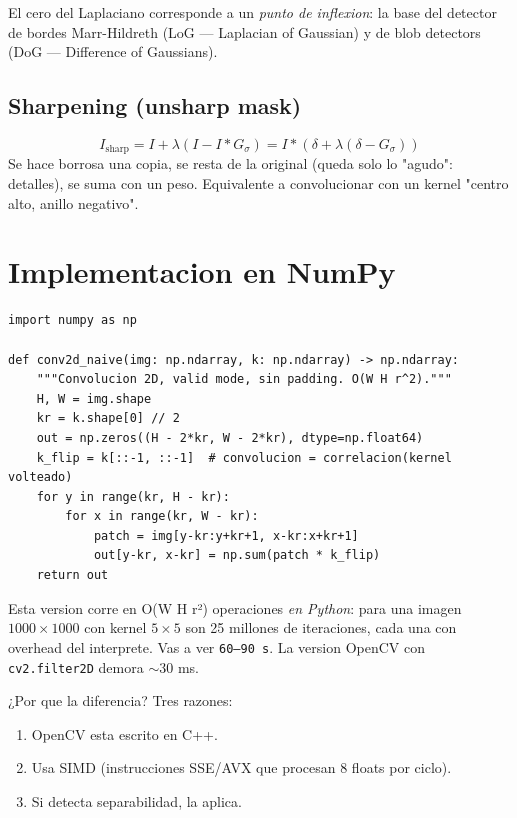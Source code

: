 \documentclass[11pt,a4paper,twoside,openright]{book}
\begin{document}
El cero del Laplaciano corresponde a un \emph{punto de inflexion}: la base del detector de bordes Marr-Hildreth (LoG --- Laplacian of Gaussian) y de blob detectors (DoG --- Difference of Gaussians).

\subsection{Sharpening (unsharp mask)}
\begin{equation}
I_{\text{sharp}} = I + \lambda (I - I * G_\sigma) = I * (\delta + \lambda(\delta - G_\sigma))
\end{equation}
Se hace borrosa una copia, se resta de la original (queda solo lo "agudo": detalles), se suma con un peso. Equivalente a convolucionar con un kernel "centro alto, anillo negativo".

\section{Implementacion en NumPy}

\begin{lstlisting}[caption={Convolucion 2D con doble for (la version educativa).}]
import numpy as np

def conv2d_naive(img: np.ndarray, k: np.ndarray) -> np.ndarray:
    """Convolucion 2D, valid mode, sin padding. O(W H r^2)."""
    H, W = img.shape
    kr = k.shape[0] // 2
    out = np.zeros((H - 2*kr, W - 2*kr), dtype=np.float64)
    k_flip = k[::-1, ::-1]  # convolucion = correlacion(kernel volteado)
    for y in range(kr, H - kr):
        for x in range(kr, W - kr):
            patch = img[y-kr:y+kr+1, x-kr:x+kr+1]
            out[y-kr, x-kr] = np.sum(patch * k_flip)
    return out
\end{lstlisting}

Esta version corre en O(W H r²) operaciones \emph{en Python}: para una imagen $1000{\times}1000$ con kernel $5{\times}5$ son 25 millones de iteraciones, cada una con overhead del interprete. Vas a ver \texttt{60--90 s}. La version OpenCV con \texttt{cv2.filter2D} demora $\sim 30$ ms.

¿Por que la diferencia? Tres razones:
\begin{enumerate}[leftmargin=2em]
  \item OpenCV esta escrito en C++.
  \item Usa SIMD (instrucciones SSE/AVX que procesan 8 floats por ciclo).
  \item Si detecta separabilidad, la aplica.
\end{enumerate}
\end{document}
